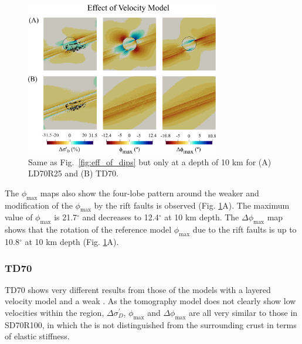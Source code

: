 \documentclass[draft]{agujournal2018}
\begin{document}
\begin{figure}[ht]
\centering
\includegraphics[width=20pc]{Figures/LD70R25_TD70_2.png}
\caption{Same as Fig.~\ref{fig:eff_of_dips} but only at a depth of 10 km for (A) LD70R25 and (B) TD70.}
\label{fig:eff_of_vel}
\end{figure}

The $\phi_{\max}$ maps also show the four-lobe pattern around the weaker  and modification of the $\phi_{\max}$ by the rift faults is observed (Fig. \ref{fig:eff_of_vel}A). The maximum value of $\phi_{\max}$ is 21.7$^\circ$ and decreases to 12.4$^\circ$ at 10 km depth. The $\Delta\phi_{\max}$ map shows that the rotation of the reference model $\phi_{\max}$ due to the rift faults is up to 10.8$^\circ$ at 10 km depth (Fig. \ref{fig:eff_of_vel}A).


\subsubsection{TD70}
TD70 shows very different results from those of the models with a layered velocity model and a weak . As the tomography model does not clearly show low velocities within the  region, $\Delta\sigma_{D}^{\prime}$, $\phi_{\max}$ and $\Delta\phi_{\max}$ are all very similar to those in SD70R100, in which the  is not distinguished from the surrounding crust in terms of elastic stiffness.
\end{document}
